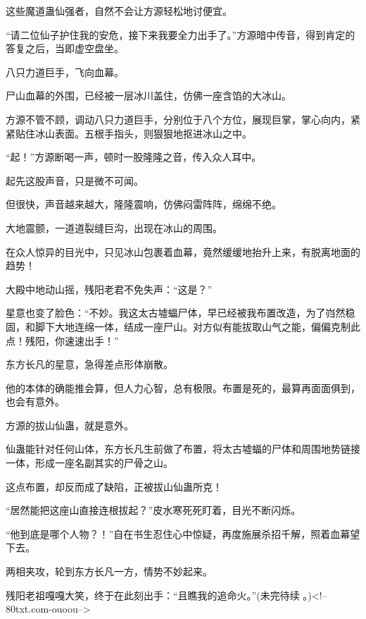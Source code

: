 \begin{this_body}
这些魔道蛊仙强者，自然不会让方源轻松地讨便宜。

“请二位仙子护住我的安危，接下来我要全力出手了。”方源暗中传音，得到肯定的答复之后，当即虚空盘坐。

八只力道巨手，飞向血幕。

尸山血幕的外围，已经被一层冰川盖住，仿佛一座含馅的大冰山。

方源不管不顾，调动八只力道巨手，分别位于八个方位，展现巨掌，掌心向内，紧紧贴住冰山表面。五根手指头，则狠狠地抠进冰山之中。

“起！”方源断喝一声，顿时一股隆隆之音，传入众人耳中。

起先这股声音，只是微不可闻。

但很快，声音越来越大，隆隆震响，仿佛闷雷阵阵，绵绵不绝。

大地震颤，一道道裂缝巨沟，出现在冰山的周围。

在众人惊异的目光中，只见冰山包裹着血幕，竟然缓缓地抬升上来，有脱离地面的趋势！

大殿中地动山摇，残阳老君不免失声：“这是？”

星意也变了脸色：“不妙。我这太古墟蝠尸体，早已经被我布置改造，为了岿然稳固，和脚下大地连绵一体，结成一座尸山。对方似有能拔取山气之能，偏偏克制此点！残阳，你速速出手！”

东方长凡的星意，急得差点形体崩散。

他的本体的确能推会算，但人力心智，总有极限。布置是死的，最算再面面俱到，也会有意外。

方源的拔山仙蛊，就是意外。

仙蛊能针对任何山体，东方长凡生前做了布置，将太古墟蝠的尸体和周围地势链接一体，形成一座名副其实的尸骨之山。

这点布置，却反而成了缺陷，正被拔山仙蛊所克！

“居然能把这座山直接连根拔起？”皮水寒死死盯着，目光不断闪烁。

“他到底是哪个人物？！”自在书生忍住心中惊疑，再度施展杀招千解，照着血幕望下去。

两相夹攻，轮到东方长凡一方，情势不妙起来。

残阳老祖嘎嘎大笑，终于在此刻出手：“且瞧我的追命火。”(未完待续 。)<!--80txt.com-ouoou-->

\end{this_body}

